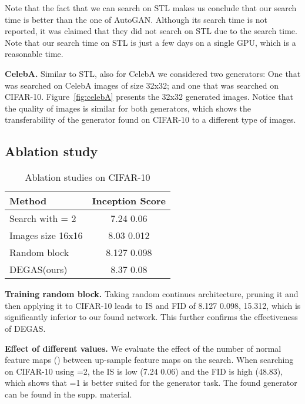 \documentclass[10pt,twocolumn,letterpaper]{article}
\newcommand{\ourmethod}{DEGAS}
\begin{document}
Note that the fact that we can search on STL makes us conclude that our search time is better than the one of AutoGAN. Although its search time is not reported, it was claimed that they did not search on STL due to the search time. Note that our search time on STL is just a few days on a single GPU, which is a reasonable time.

{\bf CelebA.} Similar to STL, also for CelebA we considered two generators: One that was searched on CelebA images of size 32x32; and one that was searched on CIFAR-10. Figure~\ref{fig:celebA} presents the 32x32 generated images. Notice that the quality of images is similar for both generators, which shows the transferability of the generator found on CIFAR-10 to a different type of images. 




\subsection{Ablation study}
\begin{table}
    \begin{center}
        \begin{tabular}{l|c}
            Method 
            & \multicolumn{1}{|p{1.45cm}}{\centering Inception Score }
            \\
            \hline
            Search with  = 2 & 7.24  0.06 \\
            Images size 16x16 & 8.03  0.012\\
            Random block  &  8.127  0.098\\ 
            \hline
            \ourmethod{}(ours) &  8.37  0.08\\ 
            \end{tabular}
    \end{center}
    \caption{Ablation studies on CIFAR-10}
    \label{ablation}
\end{table}

{\bf Training random block.}
Taking random continues architecture, pruning it and then applying it to CIFAR-10 leads to IS and FID of 8.127  0.098, 15.312, which is significantly inferior to our found network. This further confirms the effectiveness of \ourmethod{}.


{\bf Effect of different  values.}
We evaluate the effect of the number of normal feature maps () between up-sample feature maps on the search.
When searching on CIFAR-10 using =2, the IS is low (7.24  0.06) and the FID is high (48.83), which shows that =1 is better suited for the generator task. The found generator can be found in the supp. material.
\end{document}
